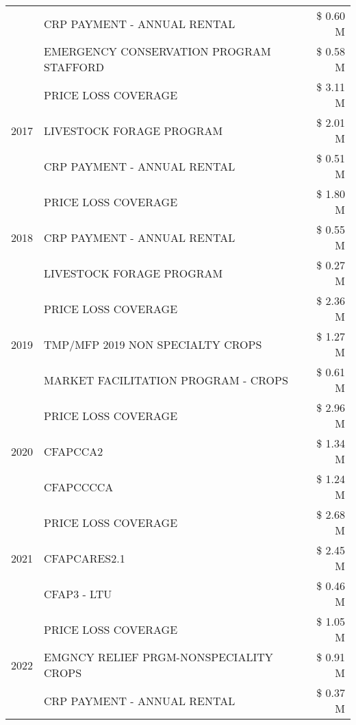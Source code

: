 \begin{tabular}{llr}
 & CRP PAYMENT - ANNUAL RENTAL & \$ 0.60 M \\
 & EMERGENCY CONSERVATION PROGRAM STAFFORD & \$ 0.58 M \\
\cline{1-3}
\multirow[t]{3}{*}{2017} & PRICE LOSS COVERAGE & \$ 3.11 M \\
 & LIVESTOCK FORAGE PROGRAM & \$ 2.01 M \\
 & CRP PAYMENT - ANNUAL RENTAL & \$ 0.51 M \\
\cline{1-3}
\multirow[t]{3}{*}{2018} & PRICE LOSS COVERAGE & \$ 1.80 M \\
 & CRP PAYMENT - ANNUAL RENTAL & \$ 0.55 M \\
 & LIVESTOCK FORAGE PROGRAM & \$ 0.27 M \\
\cline{1-3}
\multirow[t]{3}{*}{2019} & PRICE LOSS COVERAGE & \$ 2.36 M \\
 & TMP/MFP 2019 NON SPECIALTY CROPS & \$ 1.27 M \\
 & MARKET FACILITATION PROGRAM - CROPS & \$ 0.61 M \\
\cline{1-3}
\multirow[t]{3}{*}{2020} & PRICE LOSS COVERAGE & \$ 2.96 M \\
 & CFAPCCA2 & \$ 1.34 M \\
 & CFAPCCCCA & \$ 1.24 M \\
\cline{1-3}
\multirow[t]{3}{*}{2021} & PRICE LOSS COVERAGE & \$ 2.68 M \\
 & CFAPCARES2.1 & \$ 2.45 M \\
 & CFAP3 - LTU & \$ 0.46 M \\
\cline{1-3}
\multirow[t]{3}{*}{2022} & PRICE LOSS COVERAGE & \$ 1.05 M \\
 & EMGNCY RELIEF PRGM-NONSPECIALITY CROPS & \$ 0.91 M \\
 & CRP PAYMENT - ANNUAL RENTAL & \$ 0.37 M \\
\cline{1-3}
\bottomrule
\end{tabular}
